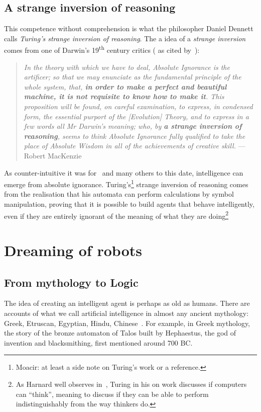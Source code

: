 \subsection{A strange inversion of reasoning}

This competence without comprehension is what the philosopher Daniel Dennett calls \emph{Turing's strange inversion of reasoning}\label{turing_strange_inversion}. The a idea of a \emph{strange inversion} comes from one of Darwin's 19\textsuperscript{th} century critics (\citeauthor{mackenzie:1868} as cited by~\citeauthor{dennett:2009}):
\begin{quote}
	\small \emph{In the theory with which we have to deal, Absolute Ignorance is the artificer; so that we may enunciate as the fundamental principle of the whole system, that, \textbf{in order to make a perfect and beautiful machine, it is not requisite to know how to make it}. This proposition will be found, on careful examination, to express, in condensed form, the essential purport of the [Evolution] Theory, and to express in a few words all Mr Darwin's meaning; who, by \textbf{a strange inversion of reasoning}, seems to think Absolute Ignorance fully qualified to take the place of Absolute Wisdom in all of the achievements of creative skill.} \flushright{} --- Robert MacKenzie\\
\end{quote}
As counter-intuitive it was for~\citeauthor{mackenzie:1868} and many others to this date, intelligence can emerge from absolute ignorance. Turing's\footnote{Moacir: at least a side note on Turing's work or a reference.} strange inversion of reasoning comes from the realisation that his automata can perform calculations by symbol manipulation, proving that it is possible to build agents that behave intelligently, even if they are entirely ignorant of the meaning of what they are doing\footnote{As Harnard well observes in~, Turing in his on work discusses if computers can ``think'', meaning to discuss if they can be able to perform indistinguishably from the way thinkers do.}

\section{Dreaming of robots}

\subsection{From mythology to Logic}
The idea of creating an intelligent agent is perhaps as old as humans. There are accounts of what we call artificial intelligence in almost any ancient mythology: Greek, Etruscan, Egyptian, Hindu, Chinese~\cite{mayor:2018}. For example, in Greek mythology, the story of the bronze automaton of Talos built by Hephaestus, the god of invention and blacksmithing, first mentioned around 700 BC.

